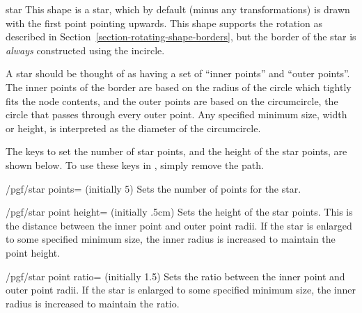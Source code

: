 \begin{shape}{star}
    This shape is a star, which by default (minus any transformations) is drawn
    with the first point pointing upwards. This shape supports the rotation as
    described in Section~\ref{section-rotating-shape-borders}, but the border
    of the star is \emph{always} constructed using the incircle.

    A star should be thought of as having a set of ``inner points'' and ``outer
    points''. The inner points of the border are based on the radius of the
    circle which tightly fits the node contents, and the outer points are based
    on the circumcircle, the circle that passes through every outer point. Any
    specified minimum size, width or height, is interpreted as the diameter of
    the circumcircle.
\begin{codeexample}[preamble={\usetikzlibrary{shapes.geometric}}]
\end{codeexample}

    The \pgfname{} keys to set the number of star points, and the height of the
    star points, are shown below. To use these keys in \tikzname, simply remove
    the  path.

    \begin{key}{/pgf/star points= (initially 5)}
        Sets the number of points for the star.
    \end{key}

    \begin{key}{/pgf/star point height= (initially .5cm)}
        Sets the height of the star points. This is the distance between the
        inner point and outer point radii. If the star is enlarged to some
        specified minimum size, the inner radius is increased to maintain the
        point height.
    \end{key}

    \begin{key}{/pgf/star point ratio= (initially 1.5)}
        Sets the ratio between the inner point and outer point radii. If the
        star is enlarged to some specified minimum size, the inner radius is
        increased to maintain the ratio.
    \end{key}


\end{shape}
